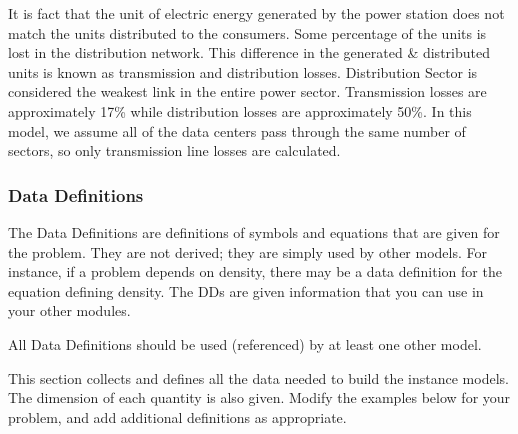 \documentclass[12pt]{article}
\begin{document}
{It is fact that the unit of electric energy generated by the power station does not match the units distributed to the consumers. Some percentage of the units is lost in the distribution network. This difference in the generated \& distributed units is known as transmission and distribution losses. Distribution Sector is considered the weakest link in the entire power sector. Transmission losses are approximately 17\% while distribution losses are approximately 50\%. In this model, we assume all of the data centers pass through the same number of sectors, so only transmission line losses are calculated.}

\subsubsection{Data Definitions}\label{sec_datadef}

{The Data Definitions are definitions of symbols and equations that are
  given for the problem.  They are not derived; they are simply used by other
  models.  For instance, if a problem depends on density, there may be a data
  definition for the equation defining density.  The DDs are given information
  that you can use in your other modules.}

{All Data Definitions should be used (referenced) by at least one other
  model.}

This section collects and defines all the data needed to build the instance
models. The dimension of each quantity is also given.  {Modify the examples
  below for your problem, and add additional definitions as appropriate.}

~\newline
\end{document}
